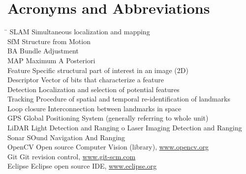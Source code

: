 \section*{Acronyms and Abbreviations}
\label{sec:acronyms}
\begin{tabbing}
	\hspace*{3.5cm}		\= \kill
	SLAM \> Simultaneous localization and mapping \\[1ex]
    SfM \> Structure from Motion \\[1ex]
    BA \> Bundle Adjustment \\[1ex]
    MAP \> Maximum A Posteriori \\[1ex]
	Feature \> Specific structural part of interest in an image (2D) \\[1ex]
	Descriptor \> Vector of bits that characterize a feature \\[1ex]
	Detection \> Localization and selection of potential features \\[1ex]
	Tracking \> Procedure of spatial and temporal re-identification of landmarks \\[1ex]
	Loop closure \> Interconnection between landmarks in space \\[1ex]
	GPS \> Global Positioning System (generally referring to whole unit) \\[1ex]
    LiDAR \> Light Detection and Ranging o Laser Imaging Detection and Ranging \\[1ex]
    Sonar \> SOund Navigation And Ranging \\[1ex]
	OpenCV  \> Open source Computer Vision (library), \url{www.opencv.org} \\[1ex]
	Git  \> Git revision control, \url{www.git-scm.com} \\[1ex]
	Eclipse \> Eclipse open source IDE, \url{www.eclipse.org}
\end{tabbing}